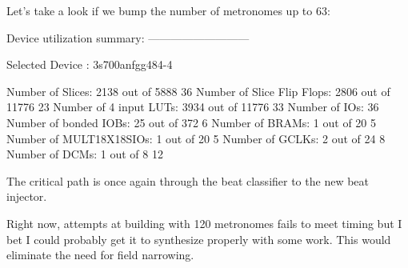 \documentclass[letterpaper]{article}
\begin{document}
Let's take a look if we bump the number of metronomes up to 63:
\begin{monospace}
Device utilization summary:
---------------------------

Selected Device : 3s700anfgg484-4 

 Number of Slices:           2138  out of   5888    36%
 Number of Slice Flip Flops: 2806  out of  11776    23%
 Number of 4 input LUTs:     3934  out of  11776    33%
 Number of IOs:                36
 Number of bonded IOBs:        25  out of    372     6%
 Number of BRAMs:               1  out of     20     5%
 Number of MULT18X18SIOs:       1  out of     20     5%
 Number of GCLKs:               2  out of     24     8%
 Number of DCMs:                1  out of      8    12%
\end{monospace}

The critical path is once again through the beat classifier to the new beat
injector.

Right now, attempts at building with 120 metronomes fails to meet timing but I
bet I could probably get it to synthesize properly with some work.  This would
eliminate the need for field narrowing.
\end{document}
